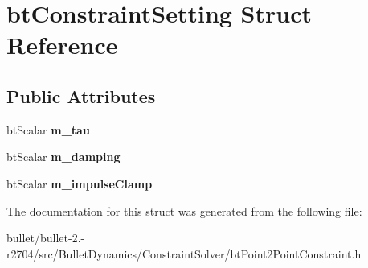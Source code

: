 \hypertarget{structbt_constraint_setting}{\section{bt\+Constraint\+Setting Struct Reference}
\label{structbt_constraint_setting}
}
\subsection*{Public Attributes}
\begin{DoxyCompactItemize}
\item 
\hypertarget{structbt_constraint_setting_a70d9a0ceb903796d1e5d2f6d564aa4df}{bt\+Scalar {\bfseries m\+\_\+tau}}\label{structbt_constraint_setting_a70d9a0ceb903796d1e5d2f6d564aa4df}

\item 
\hypertarget{structbt_constraint_setting_af9e203f9049922c0fd3cfcdcb52b5242}{bt\+Scalar {\bfseries m\+\_\+damping}}\label{structbt_constraint_setting_af9e203f9049922c0fd3cfcdcb52b5242}

\item 
\hypertarget{structbt_constraint_setting_a495ebbc03a1262535800c204fb5cf239}{bt\+Scalar {\bfseries m\+\_\+impulse\+Clamp}}\label{structbt_constraint_setting_a495ebbc03a1262535800c204fb5cf239}

\end{DoxyCompactItemize}


The documentation for this struct was generated from the following file\+:\begin{DoxyCompactItemize}
\item 
bullet/bullet-\/2.-\/r2704/src/\+Bullet\+Dynamics/\+Constraint\+Solver/bt\+Point2\+Point\+Constraint.\+h\end{DoxyCompactItemize}
